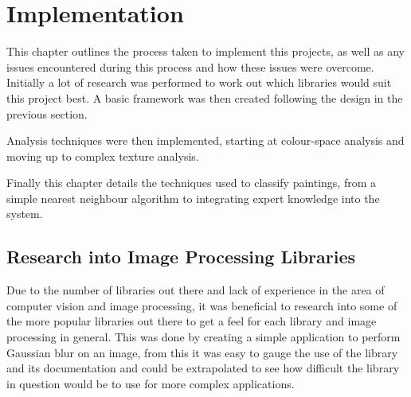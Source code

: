 \chapter{Implementation}



This chapter outlines the process taken to implement this projects, as well as any issues 
encountered during this process and how these issues were overcome. Initially a lot of research
was performed to work out which libraries would suit this project best. A basic framework was then
created following the design in the previous section.

Analysis techniques were then implemented, starting at colour-space analysis and moving up to 
complex texture analysis.

Finally this chapter details the techniques used to classify paintings, from a simple nearest
neighbour algorithm to integrating expert knowledge into the system.

\section{Research into Image Processing Libraries}\label{sec:cv-lib}

Due to the number of libraries out there and lack of experience in the area of computer vision and 
image processing, it was beneficial to research into some of the more popular libraries out there 
to get a feel for each library and image processing in general. This was done by creating a simple
application to perform Gaussian blur on an image, from this it was easy to gauge the use of the 
library and its documentation and could be extrapolated to see how difficult the library in 
question would be to use for more complex applications.

